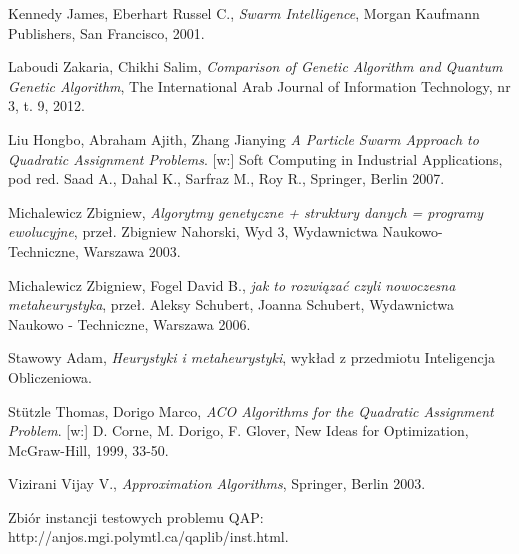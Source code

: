 \begin{thebibliography}{99}
 Kennedy James, Eberhart Russel C., \textit{Swarm Intelligence}, Morgan Kaufmann Publishers, San Francisco, 2001.

 Laboudi Zakaria, Chikhi Salim,  \textit{Comparison of Genetic Algorithm and Quantum
Genetic Algorithm}, The International Arab Journal of Information Technology, nr 3, t. 9, 2012.

 Liu Hongbo, Abraham Ajith, Zhang Jianying \textit{A Particle Swarm Approach to Quadratic Assignment Problems}. [w:] Soft Computing in Industrial Applications, pod red. Saad A., Dahal K., Sarfraz M., Roy R., Springer, Berlin 2007.

 Michalewicz Zbigniew, \textit{Algorytmy genetyczne + struktury danych = programy ewolucyjne}, przeł. Zbigniew Nahorski, Wyd 3, Wydawnictwa Naukowo-  Techniczne, Warszawa 2003.

 Michalewicz Zbigniew, Fogel David B., \textit{jak to rozwiązać czyli nowoczesna metaheurystyka}, przeł. Aleksy Schubert, Joanna Schubert, Wydawnictwa Naukowo - Techniczne, Warszawa 2006.

 Stawowy Adam, \textit{Heurystyki i metaheurystyki}, wykład z przedmiotu Inteligencja Obliczeniowa.

 St\"utzle Thomas, Dorigo Marco, \textit{ACO Algorithms for the Quadratic Assignment Problem}. [w:] D. Corne, M. Dorigo, F. Glover, New Ideas for Optimization, McGraw-Hill, 1999, 33-50.

 Vizirani Vijay V., \textit{Approximation Algorithms}, Springer, Berlin 2003.

 Zbiór instancji testowych problemu QAP: http://anjos.mgi.polymtl.ca/qaplib/inst.html.

\end{thebibliography}